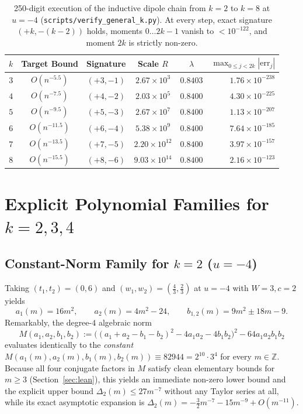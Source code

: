 \documentclass[11pt,a4paper]{article}
\theoremstyle{definition}
\theoremstyle{remark}
\newcommand{\ZZ}{\mathbb{Z}}
\begin{document}
\begin{table}[ht]
\centering
\footnotesize
\caption{250-digit execution of the inductive dipole chain from $k = 2$ to $k = 8$ at $u = -4$ (\texttt{scripts/verify\_general\_k.py}). At every step, exact signature $(+k, -(k-2))$ holds, moments $0 \dots 2k - 1$ vanish to $< 10^{-122}$, and moment $2k$ is strictly non-zero.}
\label{tab:inductive}
\begin{tabular}{@{}cccccr@{}}
\toprule
$k$ & Target Bound & Signature & Scale $R$ & $\lambda$ & $\max_{0 \le j < 2k} |\text{err}_j|$ \\
\midrule
$3$ & $O(n^{-5.5})$ & $(+3, -1)$ & $2.67 \times 10^{3}$ & $0.8403$ & $1.76 \times 10^{-238}$ \\
$4$ & $O(n^{-7.5})$ & $(+4, -2)$ & $2.03 \times 10^{5}$ & $0.8400$ & $4.30 \times 10^{-225}$ \\
$5$ & $O(n^{-9.5})$ & $(+5, -3)$ & $2.67 \times 10^{7}$ & $0.8400$ & $1.13 \times 10^{-207}$ \\
$6$ & $O(n^{-11.5})$ & $(+6, -4)$ & $5.38 \times 10^{9}$ & $0.8400$ & $7.64 \times 10^{-185}$ \\
$7$ & $O(n^{-13.5})$ & $(+7, -5)$ & $2.20 \times 10^{12}$ & $0.8400$ & $3.97 \times 10^{-157}$ \\
$8$ & $O(n^{-15.5})$ & $(+8, -6)$ & $9.03 \times 10^{14}$ & $0.8400$ & $2.16 \times 10^{-123}$ \\
\bottomrule
\end{tabular}
\end{table}

\section{Explicit Polynomial Families for $k = 2, 3, 4$}
\label{sec:explicit}

\subsection{Constant-Norm Family for $k = 2$ ($u = -4$)}

Taking $(t_1, t_2) = (0, 6)$ and $(w_1, w_2) = (\frac{4}{3}, \frac{2}{3})$ at $u = -4$ with $W = 3, c = 2$ yields
\[
a_1(m) = 16 m^2, \qquad a_2(m) = 4 m^2 - 24, \qquad b_{1,2}(m) = 9 m^2 \pm 18 m - 9.
\]
Remarkably, the degree-$4$ algebraic norm
\[
M(a_1, a_2, b_1, b_2) := \Big((a_1 + a_2 - b_1 - b_2)^2 - 4 a_1 a_2 - 4 b_1 b_2\Big)^2 - 64 a_1 a_2 b_1 b_2
\]
evaluates identically to the \emph{constant} $M(a_1(m), a_2(m), b_1(m), b_2(m)) \equiv 82944 = 2^{10} \cdot 3^4$ for every $m \in \ZZ$. Because all four conjugate factors in $M$ satisfy clean elementary bounds for $m \ge 3$ (Section~\ref{sec:lean}), this yields an immediate non-zero lower bound and the explicit upper bound $\Delta_2(m) \le 27 m^{-7}$ without any Taylor series at all, while its exact asymptotic expansion is $\Delta_2(m) = -\frac{3}{2} m^{-7} - 15 m^{-9} + O(m^{-11})$.
\end{document}
